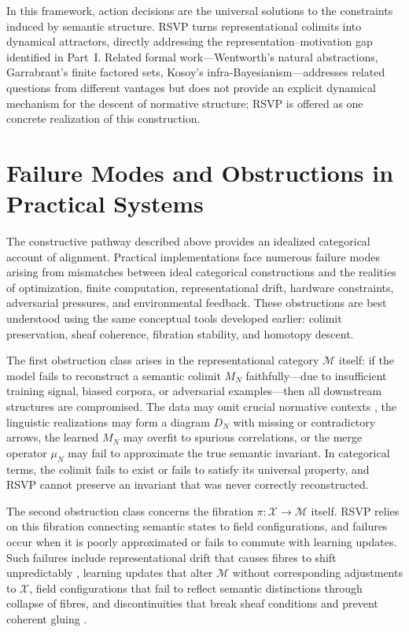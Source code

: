 \documentclass[12pt]{article}
\theoremstyle{definition}
\begin{document}
In this framework, action decisions are the universal solutions to the
constraints induced by semantic structure. RSVP turns representational colimits
into dynamical attractors, directly addressing the representation--motivation gap
identified in Part~I. Related formal work---Wentworth's natural abstractions,
Garrabrant's finite factored sets, Kosoy's infra-Bayesianism---addresses related
questions from different vantages but does not provide an explicit dynamical
mechanism for the descent of normative structure; RSVP is offered as one
concrete realization of this construction.

\section{Failure Modes and Obstructions in Practical Systems}

The constructive pathway described above provides an idealized categorical
account of alignment. Practical implementations face numerous failure modes
arising from mismatches between ideal categorical constructions and the
realities of optimization, finite computation, representational drift, hardware
constraints, adversarial pressures, and environmental feedback. These
obstructions are best understood using the same conceptual tools developed
earlier: colimit preservation, sheaf coherence, fibration stability, and
homotopy descent.

The first obstruction class arises in the representational category $\mathcal{M}$
itself: if the model fails to reconstruct a semantic colimit $M_N$
faithfully---due to insufficient training signal, biased corpora, or adversarial
examples---then all downstream structures are compromised. The data may omit
crucial normative contexts \citep{blodgett2020}, the linguistic realizations may
form a diagram $D_N$ with missing or contradictory arrows, the learned $M_N$
may overfit to spurious correlations, or the merge operator $\mu_N$ may fail to
approximate the true semantic invariant. In categorical terms, the colimit fails
to exist or fails to satisfy its universal property, and RSVP cannot preserve an
invariant that was never correctly reconstructed.

The second obstruction class concerns the fibration $\pi : \mathcal{X} \to
\mathcal{M}$ itself. RSVP relies on this fibration connecting semantic states to
field configurations, and failures occur when it is poorly approximated or fails
to commute with learning updates. Such failures include representational drift
that causes fibres to shift unpredictably \citep{elhage2022}, learning updates
that alter $\mathcal{M}$ without corresponding adjustments to $\mathcal{X}$,
field configurations that fail to reflect semantic distinctions through
collapse of fibres, and discontinuities that break sheaf conditions and prevent
coherent gluing \citep{spivak2014}.
\end{document}

